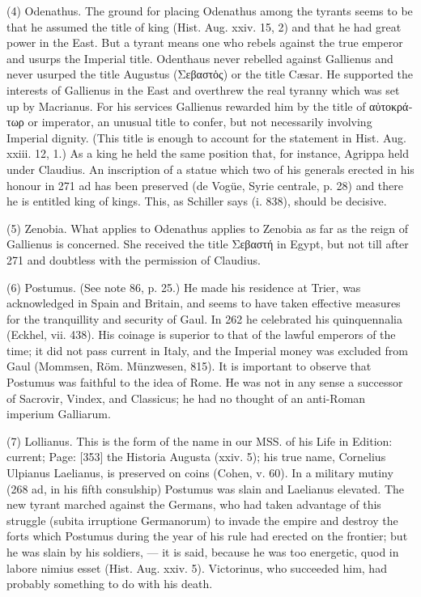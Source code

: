 (4) Odenathus. The ground for placing Odenathus among the tyrants seems to be that he assumed the title of king (Hist. Aug. xxiv. 15, 2) and that he had great power in the East. But a tyrant means one who rebels against the true emperor and usurps the Imperial title. Odenthaus never rebelled against Gallienus and never usurped the title Augustus (\textgreek{Σεβαστ\texthebrew{ὁ}ς}) or the title Cæsar. He supported the interests of Gallienus in the East and overthrew the real tyranny which was set up by Macrianus. For his services Gallienus rewarded him by the title of \textgreek{α\texthebrew{ὐ}τοκράτωρ} or imperator, an unusual title to confer, but not necessarily involving Imperial dignity. (This title is enough to account for the statement in Hist. Aug. xxiii. 12, 1.) As a king he held the same position that, for instance, Agrippa held under Claudius. An inscription of a statue which two of his generals erected in his honour in 271 ad has been preserved (de Vogüe, Syrie centrale, p. 28) and there he is entitled king of kings. This, as Schiller says (i. 838), should be decisive.

(5) Zenobia. What applies to Odenathus applies to Zenobia as far as the reign of Gallienus is concerned. She received the title \textgreek{Σεβαστή} in Egypt, but not till after 271 and doubtless with the permission of Claudius.

(6) Postumus. (See note 86, p. 25.) He made his residence at Trier, was acknowledged in Spain and Britain, and seems to have taken effective measures for the tranquillity and security of Gaul. In 262 he celebrated his quinquennalia (Eckhel, vii. 438). His coinage is superior to that of the lawful emperors of the time; it did not pass current in Italy, and the Imperial money was excluded from Gaul (Mommsen, Röm. Münzwesen, 815). It is important to observe that Postumus was faithful to the idea of Rome. He was not in any sense a successor of Sacrovir, Vindex, and Classicus; he had no thought of an anti-Roman imperium Galliarum.

(7) Lollianus. This is the form of the name in our MSS. of his Life in Edition: current; Page: [353] the Historia Augusta (xxiv. 5); his true name, Cornelius Ulpianus Laelianus, is preserved on coins (Cohen, v. 60). In a military mutiny (268 ad, in his fifth consulship) Postumus was slain and Laelianus elevated. The new tyrant marched against the Germans, who had taken advantage of this struggle (subita irruptione Germanorum) to invade the empire and destroy the forts which Postumus during the year of his rule had erected on the frontier; but he was slain by his soldiers, \texthebrew{—} it is said, because he was too energetic, quod in labore nimius esset (Hist. Aug. xxiv. 5). Victorinus, who succeeded him, had probably something to do with his death.

